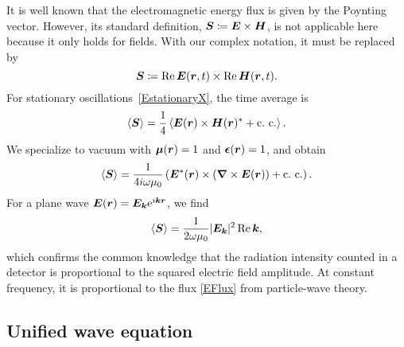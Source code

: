 It is well known that the electromagnetic energy flux is given by the Poynting vector.
%
%
%
However, its standard definition, $\bm{S}\coloneqq\bm{E}\times\bm{H}$,
is not applicable here because it only holds for  fields.
With our complex notation, it must be replaced by
\begin{equation}
  \bm{S}\coloneqq \operatorname{Re}\bm{E}(\bm{r},t)\times\operatorname{Re}\bm{H}(\bm{r},t).
\end{equation}
%
For stationary oscillations~\cref{EstationaryX},
the time average is
\begin{equation}
  \braket{\bm{S}} = \frac{1}{4}\braket{\bm{E}(\bm{r}) \times \bm{H}(\bm{r})^* + \text{c.~c.}}.
\end{equation}
%
We specialize to vacuum with $\bm{\mu}(\bm{r})=1$ and $\bm{\epsilon}(\bm{r})=1$,
and obtain
\begin{equation}
  \braket{\bm{S}}
  = \frac{1}{4i\omega\mu_0}
    \left( \bm{E}^*(\bm{r})\times\left(\bm{\nabla}\times\bm{E}(\bm{r})\right) + \text{c.~c.} \right).
\end{equation}
For a plane wave $\bm{E}(\bm{r})=\bm{E}_{\bm{k}} \mathrm e^{i{\bm{k}}\bm{r}}$, we find
\begin{equation}
  \braket{\bm{S}}
  = \frac{1}{2\omega\mu_0} |\bm{E}_{\bm{k}}|^2 \operatorname{Re} {\bm{k}},
\end{equation}
which confirms the common knowledge that the radiation intensity
counted in a detector is proportional to the squared electric field amplitude.
At constant frequency, it is proportional to the flux \cref{EFlux}
from particle-wave theory.

%
%

\subsection{Unified wave equation}\label{SuniWave}

